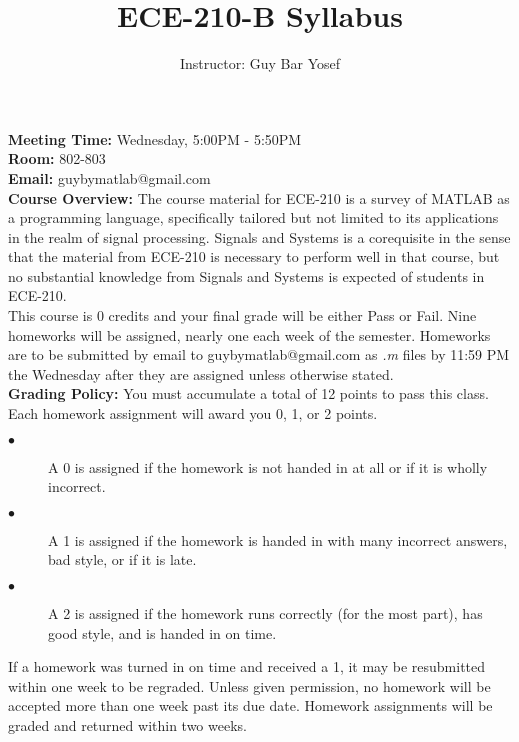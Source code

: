 \documentclass[12pt]{article}
\begin{document}

\title{ECE-210-B Syllabus}
\date{}
\author{Instructor: Guy Bar Yosef}
\maketitle

\textbf{Meeting Time:} Wednesday, 5:00PM - 5:50PM \\
\textbf{Room:} 802-803 \\
\textbf{Email:} guybymatlab@gmail.com \\

\textbf{Course Overview:}
The course material for ECE-210 is a survey of 
MATLAB as a programming language, specifically tailored but not 
limited to its applications in the realm of signal processing. 
Signals and Systems is a corequisite in the sense that the material 
from ECE-210 is necessary to perform well in that course, but no substantial 
knowledge from Signals and Systems is expected of students in ECE-210. \\
 
This course is 0 credits and your final grade will be either Pass or Fail.
Nine homeworks will be assigned, nearly one each week of the semester. 
Homeworks are to be submitted by email to guybymatlab@gmail.com as \textit{.m} 
files by 11:59 PM the Wednesday after they are assigned unless otherwise stated.\\

\textbf{Grading Policy:}
You must accumulate a total of 12 points to pass this class.
Each homework assignment will award you 0, 1, or 2 points.
\begin{description}
    \item [$\bullet$]A 0 is assigned if the homework is not handed 
    in at all or if it is wholly incorrect.
    \item [$\bullet$]A 1 is assigned if the homework is handed
    in with many incorrect answers, bad style, or if it is late.
    \item [$\bullet$]A 2 is assigned if the homework runs correctly
    (for the most part), has good style, and is handed in on time.
\end{description} 
If a homework was turned in on time and received a 1,
it may be resubmitted within one week to be regraded.
Unless given permission, no homework will be accepted more than one 
week past its due date. Homework assignments will be graded and 
returned within two weeks. \\
\end{document}

